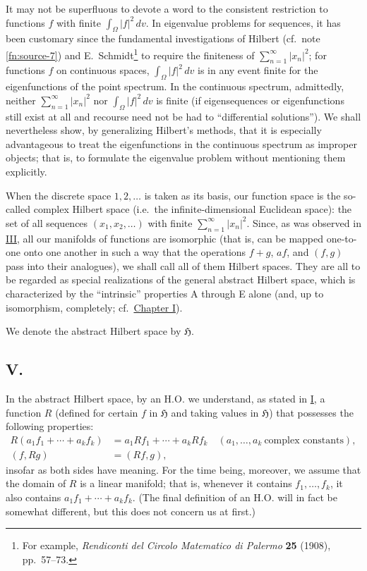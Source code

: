 ﻿\documentclass[paper=b5,fontsize=13pt,bookmarkpackage=false,twoside]{scrartcl}
\begin{document}
It may not be superfluous to devote a word to the consistent restriction to functions $f$ with finite $\int_\Omega|f|^2\,dv$. In eigenvalue problems for sequences, it has been customary since the fundamental investigations of Hilbert (cf.\ note \ref{fn:source-7}) and E.~Schmidt\footnote{\label{fn:source-11}For example, \emph{Rendiconti del Circolo Matematico di Palermo} \textbf{25} (1908), pp.~57--73.} to require the finiteness of $\sum_{n=1}^{\infty}|x_n|^2$; for functions $f$ on continuous spaces, $\int_\Omega|f|^2\,dv$ is in any event finite for the eigenfunctions of the point spectrum. In the continuous spectrum, admittedly, neither $\sum_{n=1}^{\infty}|x_n|^2$ nor $\int_\Omega|f|^2\,dv$ is finite (if eigensequences or eigenfunctions still exist at all and recourse need not be had to ``differential solutions''). We shall nevertheless show, by generalizing Hilbert's methods, that it is especially advantageous to treat the eigenfunctions in the continuous spectrum as improper objects; that is, to formulate the eigenvalue problem without mentioning them explicitly.

When the discrete space $1,2,\ldots$ is taken as its basis, our function space is the so-called complex Hilbert space (i.e.\ the infinite-dimensional Euclidean space): the set of all sequences $(x_1,x_2,\ldots)$ with finite $\sum_{n=1}^{\infty}|x_n|^2$. Since, as was observed in \hyperref[intro:III]{III}, all our manifolds of functions are isomorphic (that is, can be mapped one-to-one onto one another in such a way that the operations $f+g$, $a f$, and $(f,g)$ pass into their analogues), we shall call all of them Hilbert spaces. They are all to be regarded as special realizations of the general abstract Hilbert space, which is characterized by the ``intrinsic'' properties A through E alone (and, up to isomorphism, completely; cf.\ \hyperref[chap:I]{Chapter I}).

We denote the abstract Hilbert space by $\mathfrak H$.

\subsection*{V.}\label{intro:V}

In the abstract Hilbert space, by an H.O. we understand, as stated in \hyperref[intro:I]{I}, a function $R$ (defined for certain $f$ in $\mathfrak H$ and taking values in $\mathfrak H$) that possesses the following properties:
\begin{align}
 R(a_1f_1+\cdots+a_kf_k)
 &=a_1Rf_1+\cdots+a_kRf_k
 \quad
 (a_1,\ldots,a_k\ \text{complex constants}),
 \tag{$\alpha$}\label{eq:intro-V-alpha}\\
 (f,Rg)&=(Rf,g),
 \tag{$\beta$}\label{eq:intro-V-beta}
\end{align}
insofar as both sides have meaning. For the time being, moreover, we assume that the domain of $R$ is a linear manifold; that is, whenever it contains $f_1,\ldots,f_k$, it also contains $a_1f_1+\cdots+a_kf_k$. (The final definition of an H.O. will in fact be somewhat different, but this does not concern us at first.)
\end{document}

